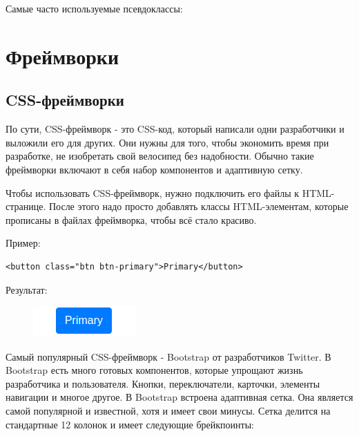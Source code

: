 \documentclass[14pt]{extreport}
\begin{document}
Самые часто используемые псевдоклассы:






\chapter{Фреймворки}

\section{CSS-фреймворки}

По сути, CSS-фреймворк - это CSS-код, который написали одни разработчики и выложили его для других. Они нужны для того, чтобы экономить время при разработке, не изобретать свой велосипед без надобности. Обычно такие фреймворки включают в себя набор компонентов и адаптивную сетку.

﻿Чтобы использовать CSS-фреймворк, нужно подключить его файлы к HTML-странице. После этого надо ﻿просто добавлять классы HTML-элементам﻿, которые прописаны в файлах фреймворка, чтобы всё стало красиво.

Пример:
\begin{verbatim}
<button class="btn btn-primary">Primary</button>
\end{verbatim}
Результат:
\begin{figure}[H]
\centerline{\includegraphics[width=0.2\linewidth]{pics_practice/primary-button.png}}
\caption{}
\label{11}
\end{figure}

Самый популярный CSS-фреймворк - Bootstrap от разработчиков Twitter. В Bootstrap есть много готовых компонентов, которые упрощают жизнь разработчика и пользователя. Кнопки, переключатели, карточки, элементы навигации и многое другое. В Bootstrap встроена адаптивная сетка. Она является самой популярной и известной, хотя и имеет свои минусы. Сетка делится на стандартные 12 колонок и имеет следующие брейкпоинты:
\end{document}
